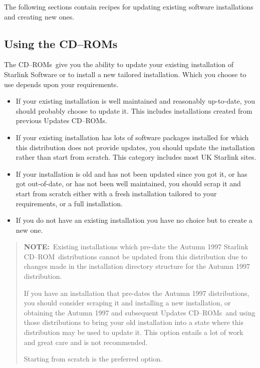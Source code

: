 \documentclass[twoside,11pt]{article}
\newcommand{\xlabel}[1]{}
\renewcommand{\_}{\texttt{\symbol{95}}}
\newcommand{\cdrom}{CD--ROM}
\newcommand{\cdrom}{CD-ROM}
\newcommand{\cdroms}{CD--ROMs}
\newcommand{\cdroms}{CD-ROMs}
\begin{document}
The following sections contain recipes for updating existing software
installations and creating new ones.  

\subsection{\xlabel{using_the_cdroms}Using the \cdroms}
\label{using_the_cdroms}

The \cdroms\ give you the ability to update your existing
installation of Starlink Software or to install a new tailored
installation.  Which you choose to use depends upon your requirements. 

\begin{itemize}

\item If your existing installation is well maintained and reasonably
up-to-date, you should probably choose to update it.  This includes
installations created from previous Updates \cdroms.

\item If your existing installation has lots of software packages
installed for which this distribution does not provide updates, you
should update the installation rather than start from scratch.
This category includes most UK Starlink sites.

\item If your installation is old and has not been updated since you got
it, or has got out-of-date, or has not been well maintained, you should
scrap it and start from scratch either with a fresh installation tailored 
to your requirements, or a full installation. 

\item If you do not have an existing installation you have no choice but to
create a new one.  

\end{itemize}

\begin{quote}
\textbf{NOTE:}~Existing installations which pre-date the Autumn 1997
Starlink \cdrom\ distributions cannot be updated from this distribution
due to changes made in the installation directory structure for the
Autumn 1997 distribution.

If you have an installation that pre-dates the Autumn 1997
distributions, you should consider scraping it and installing a new
installation, or obtaining the Autumn 1997 and subsequent Updates
\cdroms\ and using those distributions to bring your old installation
into a state where this distribution may be used to update it.  This
option entails a lot of work and great care and is not recommended.

Starting from scratch is the preferred option.
\end{quote}
\end{document}
